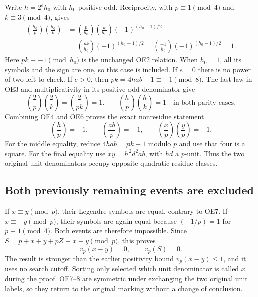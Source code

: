 Write $h=2^e h_0$ with $h_0$ positive odd. Reciprocity, with
$p\equiv1\pmod4$ and $k\equiv3\pmod4$, gives
\begin{align}
 \left(\frac{h_0}{p}\right)\left(\frac{h_0}{k}\right)
 &=\left(\frac p{h_0}\right)\left(\frac k{h_0}\right)
       (-1)^{(h_0-1)/2} \nonumber\\
 &=\left(\frac{pk}{h_0}\right)(-1)^{(h_0-1)/2}
  =\left(\frac{-1}{h_0}\right)(-1)^{(h_0-1)/2}=1.
                                                               \tag{OE5}
\end{align}
Here $pk\equiv-1\pmod{h_0}$ is the unchanged OE2 relation.
When $h_0=1$, all its symbols and the sign are one, so this case
is included. If $e=0$ there is no power of two left to check.
If $e>0$, then $pk=4hab-1\equiv-1\pmod8$. The last law in OE3
and multiplicativity in its positive odd denominator give
\begin{equation}
 \left(\frac2p\right)\left(\frac2k\right)
     =\left(\frac2{pk}\right)=1.
 \qquad
 \left(\frac hp\right)\left(\frac hk\right)=1
 \quad\text{in both parity cases}.                     \tag{OE6}
\end{equation}
Combining OE4 and OE6 proves the exact nonresidue statement
\begin{equation}
 \boxed{\left(\frac hp\right)=-1.}\qquad
 \left(\frac{ab}{p}\right)=-1,
 \qquad \boxed{\left(\frac xp\right)
                       \left(\frac yp\right)=-1.}      \tag{OE7}
\end{equation}
For the middle equality, reduce $4hab=pk+1$ modulo $p$ and use
that four is a square. For the final equality use
$xy=h^2d^2ab$, with $hd$ a $p$-unit. Thus the two original unit
denominators occupy opposite quadratic-residue classes.

\subsection{Both previously remaining events are excluded}
If $x\equiv y\pmod p$, their Legendre symbols are equal, contrary
to OE7. If $x\equiv-y\pmod p$, their symbols are again equal
because $(-1/p)=1$ for $p\equiv1\pmod4$. Both events are therefore
impossible. Since $S=p+x+y+pZ\equiv x+y\pmod p$, this proves
\begin{equation}
 \boxed{v_p(x-y)=0,\qquad v_p(S)=0.}                    \tag{OE8}
\end{equation}
The result is stronger than the earlier positivity bound
$v_p(x-y)\le1$, and it uses no search cutoff. Sorting only selected
which unit denominator is called $x$ during the proof. OE7--8 are
symmetric under exchanging the two original unit labels, so they
return to the original marking without a change of conclusion.

